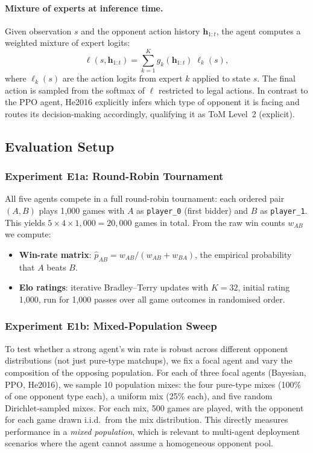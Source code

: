 \documentclass{article}
\begin{document}
  \paragraph{Mixture of experts at inference time.} Given observation $s$ and the
  opponent action history $\mathbf{h}_{1:t}$, the agent computes a weighted
  mixture of expert logits:
  \[
    \ell(s, \mathbf{h}_{1:t}) = \sum_{k=1}^{K} g_k(\mathbf{h}_{1:t})\;
      \ell_k(s),
  \]
  where $\ell_k(s)$ are the action logits from expert $k$ applied to state $s$.
  The final action is sampled from the softmax of $\ell$ restricted to legal
  actions. In contrast to the PPO agent, He2016 explicitly infers which type of
  opponent it is facing and routes its decision-making accordingly, qualifying it
  as ToM Level~2 (explicit).

  \subsection{Evaluation Setup}

  \subsubsection{Experiment E1a: Round-Robin Tournament}

  All five agents compete in a full round-robin tournament: each ordered pair
  $(A, B)$ plays 1{,}000 games with $A$ as \texttt{player\_0} (first bidder) and
  $B$ as \texttt{player\_1}. This yields $5 \times 4 \times 1{,}000 = 20{,}000$
  games in total. From the raw win counts $w_{AB}$ we compute:
  \begin{itemize}
    \item \textbf{Win-rate matrix}: $\hat{p}_{AB} = w_{AB} / (w_{AB} + w_{BA})$,
      the empirical probability that $A$ beats $B$.
    \item \textbf{Elo ratings}: iterative Bradley--Terry updates with $K = 32$,
      initial rating 1{,}000, run for 1{,}000 passes over all game outcomes in
      randomised order.
  \end{itemize}

  \subsubsection{Experiment E1b: Mixed-Population Sweep}

  To test whether a strong agent's win rate is robust across different opponent
  distributions (not just pure-type matchups), we fix a focal agent and vary the
  composition of the opposing population. For each of three focal agents
  (Bayesian, PPO, He2016), we sample 10 population mixes: the four pure-type mixes
  (100\% of one opponent type each), a uniform mix (25\% each), and five random
  Dirichlet-sampled mixes. For each mix, 500 games are played, with the opponent
  for each game drawn i.i.d.\ from the mix distribution. This directly measures
  performance in a \emph{mixed population}, which is relevant to multi-agent
  deployment scenarios where the agent cannot assume a homogeneous opponent pool.
\end{document}
